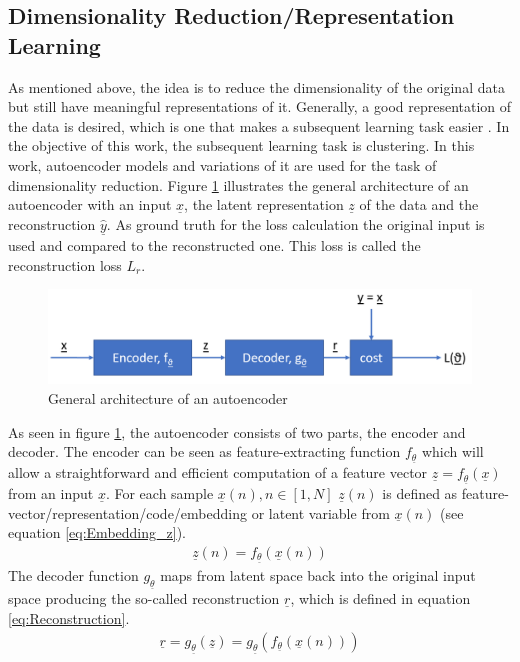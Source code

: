 \documentclass[12pt,DIV14,BCOR12mm,a4paper,footexclude,headinclude,halfparskip-,twoside,openright,cleardoubleempty,idxtotoc,bibtotoc,listtotoc,abstracton]{scrreprt} %
\numberwithin{equation}{chapter}
\begin{document}
\subsection{Dimensionality Reduction/Representation Learning}
As mentioned above, the idea is to reduce the dimensionality of the original data but still have meaningful representations of it. Generally, a good representation of the data is desired, which is one that makes a subsequent learning task easier \cite{Goodfellow-et-al-2016}. In the objective of this work, the subsequent learning task is clustering. In this work, autoencoder models and variations of it are used for the task of dimensionality reduction. Figure \ref{fig:Autoencoder} illustrates the general architecture of an autoencoder with an input $\underline{x}$, the latent representation $\underline{z}$ of the data and the reconstruction $\underline{\hat{y}}$. As ground truth for the loss calculation the original input is used and compared to the reconstructed one. This loss is called the reconstruction loss $L_{r}$.
\begin{figure}[htb!]
	\centering
	\includegraphics[width=0.6\linewidth]{Graphiken/Autoencoder_Architecture}
	\caption{General architecture of an autoencoder}
	\label{fig:Autoencoder}
\end{figure}
As seen in figure \ref{fig:Autoencoder}, the autoencoder consists of two parts, the encoder and decoder. The encoder can be seen as feature-extracting function $f_{\underline{\theta}}$ which will allow a straightforward and efficient computation of a feature vector $\underline{z} = f_{\underline{\theta}}(\underline{x})$ from an input $\underline{x}$. For each sample $\underline{x}(n), n \in [1,N]$ $\underline{z}(n)$ is defined as feature-vector/representation/code/embedding or latent variable from $\underline{x}(n)$ (see equation \ref{eq:Embedding_z}). 
\begin{align}
	\underline{z}(n) = f_{\underline{\theta}}(\underline{x}(n))\label{eq:Embedding_z}
\end{align}
The decoder function $g_{\underline{\theta}}$ maps from latent space back into the original input space producing the so-called reconstruction $\underline{r}$, which is defined in equation \ref{eq:Reconstruction}.
\begin{align}
	\underline{r} = g_{\underline{\theta}}(\underline{z}) = g_{\underline{\theta}}(f_{\underline{\theta}}(\underline{x}(n)))\label{eq:Reconstruction}
\end{align}
\end{document}
